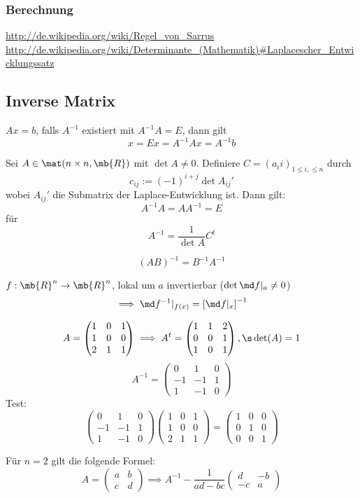\subsubsection{Berechnung}
\url{http://de.wikipedia.org/wiki/Regel_von_Sarrus}
\url{http://de.wikipedia.org/wiki/Determinante_(Mathematik)#Laplacescher_Entwicklungssatz}
\subsection{Inverse Matrix}
$Ax=b$, falls $A^{-1}$ existiert mit $A^{-1}A=E$, dann gilt
\[x=Ex=A^{-1}Ax=A^{-1}b\]
\begin{Sat}
  Sei $A\in\mat(n\times n,\mb{R})$ mit $\det A\neq 0$. Definiere $C=(a_ii)_{1\leq i, \leq n}$ durch
  \[c_{ij}:=(-1)^{i+j}\det A_{ij}'\]
  wobei $A_{ij}'$ die Submatrix der Laplace-Entwicklung ist.
  Dann gilt:
  \[A^{-1}A=AA^{-1}=E\]
  für
  \[A^{-1}=\frac{1}{\det A}C^t\]
\end{Sat}
\begin{Bem}
  \[(AB)^{-1}=B^{-1}A^{-1}\]
\end{Bem}
\begin{Bsp}
  $f:\mb{R}^n\to\mb{R}^n$, lokal um $a$ invertierbar ($\det\md f|_a\neq 0$)
  \[\implies\md f^{-1}|_{f(x)}=\left[ \md f|_x \right]^{-1}\]
\end{Bsp}
\begin{Bsp}
  \[A= \begin{pmatrix}
    1&0&1\\
    1&0&0\\
    2&1&1
  \end{pmatrix} \implies A^t= \begin{pmatrix}
    1&1&2\\
    0&0&1\\
    1&0&1
  \end{pmatrix},\s\det(A)=1\]
  \[A^{-1}= \begin{pmatrix}
    0&1&0\\
    -1&-1&1\\
    1&-1&0
  \end{pmatrix}\]
  Test:
  \[\begin{pmatrix}
    0&1&0\\
    -1&-1&1\\
    1&-1&0
  \end{pmatrix}\begin{pmatrix}
    1&0&1\\
    1&0&0\\
    2&1&1
  \end{pmatrix}=\begin{pmatrix}
    1&0&0\\
    0&1&0\\
    0&0&1
  \end{pmatrix}\]
\end{Bsp}
\begin{Bem}
  Für $n=2$ gilt die folgende Formel:
  \[A= \begin{pmatrix}
    a&b\\c&d
  \end{pmatrix}\implies A^{-1}-\frac{1}{ad-bc} \begin{pmatrix}
    d&-b\\-c&a
  \end{pmatrix}\]
\end{Bem}
